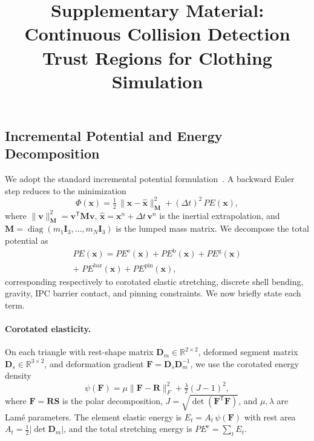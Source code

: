 \documentclass[acmtog,anonymous,review]{acmart}
\title{Supplementary Material:\\
Continuous Collision Detection Trust Regions for Clothing Simulation}
\DeclareMathOperator{\diag}{diag}
\begin{document}
\maketitle

\subsection{Incremental Potential and Energy Decomposition}
\label{sec:incremtal_energy}

We adopt the standard incremental potential
formulation~\cite{li2020ipc}. A backward Euler step reduces to the
minimization
\begin{equation}
\label{eq:inc_pot}
\Phi(\mathbf{x})
=
\tfrac{1}{2}\,
\|\mathbf{x}-\hat{\mathbf{x}}\|_{\mathbf{M}}^{2}
+
(\Delta t)^2\,PE(\mathbf{x}),
\end{equation}
where
$\|\mathbf{v}\|_{\mathbf{M}}^{2}
=\mathbf{v}^{\mathsf T}\mathbf{M}\mathbf{v}$,
$\hat{\mathbf{x}}=\mathbf{x}^n+\Delta t\,\mathbf{v}^n$ is the
inertial extrapolation, and
$\mathbf{M}=\diag(m_1\mathbf{I}_3,\dots,m_N\mathbf{I}_3)$
is the lumped mass matrix. We decompose the total potential as
\begin{multline}
\label{eq:pe_decomp}
PE(\mathbf{x})
=
PE^{\mathrm{e}}(\mathbf{x})
+
PE^{\mathrm{b}}(\mathbf{x})
+
PE^{\mathrm{g}}(\mathbf{x})
\\
+\;
PE^{\mathrm{bar}}(\mathbf{x})
+
PE^{\mathrm{pin}}(\mathbf{x}),
\end{multline}
corresponding respectively to corotated elastic stretching,
discrete shell bending, gravity, IPC barrier contact, and pinning
constraints. We now briefly state each term.

\paragraph{Corotated elasticity.}
On each triangle with rest-shape matrix
$\mathbf{D}_m\in\mathbb{R}^{2\times 2}$, deformed segment matrix
$\mathbf{D}_s\in\mathbb{R}^{3\times 2}$, and deformation gradient
$\mathbf{F}=\mathbf{D}_s\mathbf{D}_m^{-1}$, we use the corotated
energy density~\cite{stomakhin2012elasticity}
\begin{equation}
\label{eq:psi_corotated}
\psi(\mathbf{F})
=
\mu\|\mathbf{F}-\mathbf{R}\|_F^2
+
\tfrac{\lambda}{2}(J-1)^2,
\end{equation}
where $\mathbf{F}=\mathbf{R}\mathbf{S}$ is the polar decomposition,
$J=\sqrt{\det(\mathbf{F}^{\mathsf T}\mathbf{F})}$, and $\mu,\lambda$
are Lam\'{e} parameters. The element elastic energy is
$E_t=A_t\,\psi(\mathbf{F})$ with rest area
$A_t=\tfrac{1}{2}|\det\mathbf{D}_m|$, and the total stretching
energy is $PE^{\mathrm{e}}=\sum_t E_t$.
\end{document}
